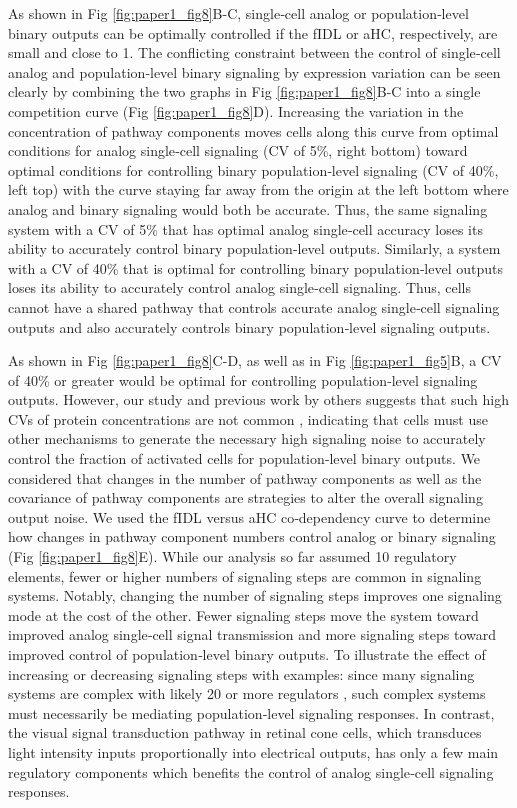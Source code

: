 As shown in Fig \ref{fig:paper1_fig8}B-C, single‐cell analog or population‐level binary outputs can be optimally controlled if the fIDL or aHC, respectively, are small and close to 1. The conflicting constraint between the control of single‐cell analog and population‐level binary signaling by expression variation can be seen clearly by combining the two graphs in Fig \ref{fig:paper1_fig8}B-C into a single competition curve (Fig \ref{fig:paper1_fig8}D). Increasing the variation in the concentration of pathway components moves cells along this curve from optimal conditions for analog single‐cell signaling (CV of 5\%, right bottom) toward optimal conditions for controlling binary population‐level signaling (CV of 40\%, left top) with the curve staying far away from the origin at the left bottom where analog and binary signaling would both be accurate. Thus, the same signaling system with a CV of 5\% that has optimal analog single‐cell accuracy loses its ability to accurately control binary population‐level outputs. Similarly, a system with a CV of 40\% that is optimal for controlling binary population‐level outputs loses its ability to accurately control analog single‐cell signaling. Thus, cells cannot have a shared pathway that controls accurate analog single‐cell signaling outputs and also accurately controls binary population‐level signaling outputs.

As shown in Fig \ref{fig:paper1_fig8}C-D, as well as in Fig \ref{fig:paper1_fig5}B, a CV of 40\% or greater would be optimal for controlling population‐level signaling outputs. However, our study and previous work by others suggests that such high CVs of protein concentrations are not common \cite{Sigal2006, Gaudet2012}, indicating that cells must use other mechanisms to generate the necessary high signaling noise to accurately control the fraction of activated cells for population‐level binary outputs. We considered that changes in the number of pathway components as well as the covariance of pathway components are strategies to alter the overall signaling output noise. We used the fIDL versus aHC co‐dependency curve to determine how changes in pathway component numbers control analog or binary signaling (Fig \ref{fig:paper1_fig8}E). While our analysis so far assumed 10 regulatory elements, fewer or higher numbers of signaling steps are common in signaling systems. Notably, changing the number of signaling steps improves one signaling mode at the cost of the other. Fewer signaling steps move the system toward improved analog single‐cell signal transmission and more signaling steps toward improved control of population‐level binary outputs. To illustrate the effect of increasing or decreasing signaling steps with examples: since many signaling systems are complex with likely 20 or more regulators \cite{Sturm2010, Gaudet2012}, such complex systems must necessarily be mediating population‐level signaling responses. In contrast, the visual signal transduction pathway in retinal cone cells, which transduces light intensity inputs proportionally into electrical outputs, has only a few main regulatory components \cite{Arshavsky2002} which benefits the control of analog single‐cell signaling responses.

